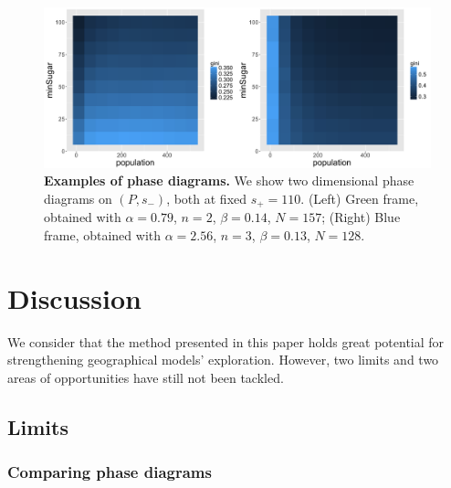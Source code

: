\documentclass{JASSS}
\begin{document}
\begin{figure}[!t]
\centering
	\includegraphics[width=\textwidth]{figures/Fig6.png}
\caption{\textbf{Examples of phase diagrams.} We show two dimensional phase diagrams on $(P,s_-)$, both at fixed $s_+ = 110$. (Left) Green frame, obtained with $\alpha = 0.79$, $n=2$, $\beta = 0.14$, $N=157$; (Right) Blue frame, obtained with $\alpha = 2.56$, $n=3$, $\beta = 0.13$, $N=128$.}
\label{fig:sugarscape-phasediagrams}
\end{figure}


\section{Discussion}

We consider that the method presented in this paper holds great potential for strengthening geographical models' exploration. However, two limits and two areas of opportunities have still not been tackled. 

\subsection{Limits}

\subsubsection{Comparing phase diagrams}
\end{document}
